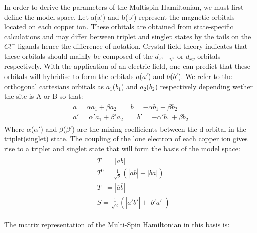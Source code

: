 \documentclass[12pt]{report}
\numberwithin{equation}{section}
\begin{document}
In order to derive the parameters of the Multispin Hamiltonian, we must first define the model space.
Let a(a') and b(b') represent the magnetic orbitals located on each copper ion. These orbitals are obtained from state-specific calculations and may differ between triplet and singlet states by the tails on the $Cl^-$ ligands hence the difference of notation.
Crystal field theory indicates that these orbitals should mainly be composed of the $d_{x^2-y^2}$ or $d_{xy}$ orbitals respectively.
With the application of an electric field, one can predict that these orbitals will hybridise to form the orbitals $a$($a'$) and $b$($b'$).
We refer to the orthogonal cartesians orbitals as $a_1$($b_1$) and $a_2$($b_2$) respectively depending wether the site is A or B so that:
\begin{align}
    \begin{split}
    a=\alpha a_1 + \beta a_2 \qquad b=-\alpha b_1  + \beta b_2 \\
    a'= \alpha ' a_1 +\beta ' a_2 \qquad b'=-\alpha' b_1 +\beta b_2
    \end{split}
\end{align}
Where $\alpha$($\alpha'$) and $\beta$($\beta'$) are the mixing coefficients between the d-orbital in the triplet(singlet) state.
The coupling of the lone electron of each copper ion gives rise to a triplet and singlet state that will form the basis of the model space:
\begin{align}
    \begin{split}
    &T^+=|ab|\\
    &T^0=\frac{1}{\sqrt{2}}(|a\overline{b}|-|b\overline{a}|)\\
    &T^-=|\overline{a}\overline{b}|\\
    &S=\frac{1}{\sqrt{2}}(|a'\overline{b'}|+|b'\overline{a'}|)
    \end{split}
\end{align}

The matrix representation of the Multi-Spin Hamiltonian in this basis is:
\end{document}
